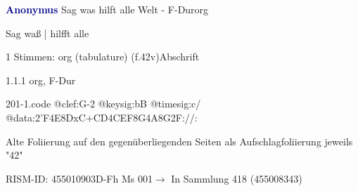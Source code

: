 \documentclass[twocolumn, 12pt]{book}
\begin{document}
\par \vspace{16pt} \textcolor{darkblue}{\textbf{Anonymus  }}\hfillplus{\textbf{[201]}}\newline Sag was hilft alle Welt - F-Dur\newline org
\par \begin{itshape}[f.42v, at left:] Sag waß | hilfft alle\end{itshape} 
\par \textcolor{darkblue}{}  1 Stimmen: org (tabulature)  (f.42v)\newline Abschrift
\par 1.1.1  org, F-Dur  
\begin{filecontents*}{201-1.code}
@clef:G-2
@keysig:bB
@timesig:c/
@data:2'F4E{8DxC+}{CD}4CEF8G4A8G2F://:
\end{filecontents*}
\newline %
\par Alte Foliierung auf den gegenüberliegenden Seiten als Aufschlagfoliierung jeweils "42"
\par RISM-ID: 455010903\newline D-Fh  Ms 001\newline $\rightarrow$ In Sammlung 418 (455008343)
      
\end{document}
